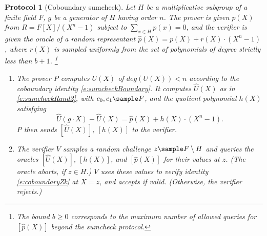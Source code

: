 \documentclass[10pt,article,oneside]{memoir}
\newtheorem{thm}{Theorem}[]
\newtheorem{protocol}[]{Protocol}
\theoremstyle{definition}
\theoremstyle{remark}
\begin{document}

\begin{protocol}[Coboundary sumcheck]
\label{p:coboundarySumcheck}
Let $H$ be a multiplicative subgroup of a finite field $F$, $g$ be a generator of $H$ having order $n$.
The prover is given $p(X)$ from $R= F[X]/(X^n-1)$ subject to $\sum_{x\in H}p(x) = 0$, and the verifier is given the oracle of a random representant $\hat p(X)= p(X) + r(X)\cdot (X^n-1)$, where $r(X)$ is sampled uniformly from the set of polynomials of degree strictly less than $b+1$.
\footnote{The bound $b\geq 0$ corresponds to the maximum number of allowed queries for $[\hat p(X)]$ beyond the sumcheck protocol.}
\begin{enumerate}
\item 
The prover $P$ computes $U(X)$ of $deg(U(X))<n$ according to the coboundary identity \eqref{e:sumcheckBoundary}.
It computes $\hat U(X)$ as in \eqref{e:sumcheckRand2},  with $c_0,c_1\sample F$, and the quotient polynomial $h(X)$
satisfying
\begin{equation}
\label{e:coboundaryZk}
\hat U(g\cdot X)- \hat U(X) = \hat p(X) + h(X)\cdot (X^n-1).
\end{equation}
$P$ then sends $[\hat U(X)]$, $[h(X)]$ to the verifier.
\item
The verifier $V$ samples a random challenge $z\sample F\setminus H$ and queries the oracles  $[\hat U(X)]$, $[h(X)]$, and $[\hat p(X)]$ for their values at $z$. 
(The oracle aborts, if $z\in H$.)  
$V$  uses these values to verify identity \eqref{e:coboundaryZk} at $X=z$, and accepts if valid. 
(Otherwise, the verifier rejects.)
\end{enumerate}
\end{protocol}


\end{document}
